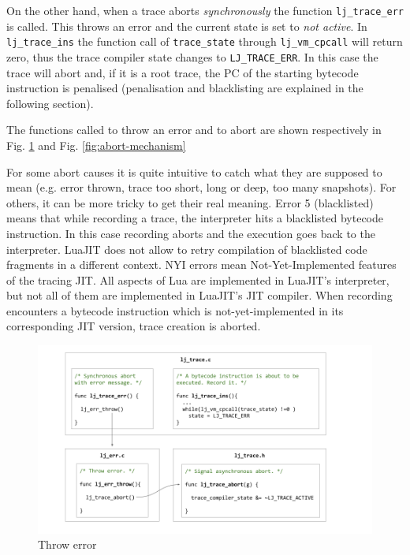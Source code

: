 On the other hand, when a trace aborts \textit{synchronously} the function \texttt{lj\_trace\_err} is called. This throws an error and the current state is set to \textit{not active}. In \texttt{lj\_trace\_ins} the function call of \texttt{trace\_state} through \texttt{lj\_vm\_cpcall} will return zero, thus the trace compiler state changes to \texttt{LJ\_TRACE\_ERR}. In this case the trace will abort and, if it is a root trace, the PC of the starting bytecode instruction is penalised (penalisation and blacklisting are explained in the following section).

The functions called to throw an error and to abort are shown respectively in Fig. \ref{fig:throw-err} and Fig. \ref{fig:abort-mechanism}

For some abort causes it is quite intuitive to catch what they are supposed to mean (e.g. error thrown, trace too short, long or deep, too many snapshots). For others, it can be more tricky to get their real meaning. Error 5 (blacklisted) means that while recording a trace, the interpreter hits a  blacklisted bytecode instruction. In this case recording aborts and the execution goes back to the interpreter. LuaJIT does not allow to retry compilation of blacklisted code fragments in a different context. NYI errors mean Not-Yet-Implemented features of the tracing JIT. All aspects of Lua are implemented in LuaJIT's interpreter, but not all of them are implemented in LuaJIT's JIT compiler. When recording encounters a bytecode instruction which is not-yet-implemented in its corresponding JIT version, trace creation is aborted. 

\begin{figure}[H]
    \centering
	\includegraphics[width=\textwidth]{images/chapter7/throw_error.png}
    \caption{Throw error}
    \label{fig:throw-err}
\end{figure}

